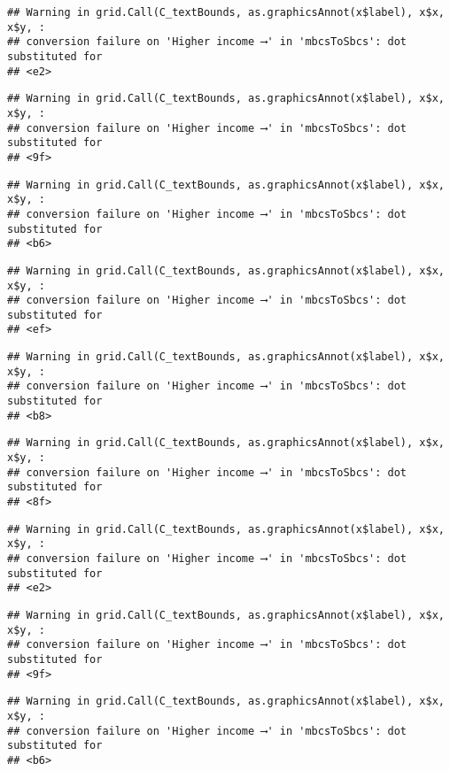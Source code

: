 \documentclass[
]{article}
\begin{document}
\begin{verbatim}
## Warning in grid.Call(C_textBounds, as.graphicsAnnot(x$label), x$x, x$y, :
## conversion failure on 'Higher income ⟶️' in 'mbcsToSbcs': dot substituted for
## <e2>
\end{verbatim}

\begin{verbatim}
## Warning in grid.Call(C_textBounds, as.graphicsAnnot(x$label), x$x, x$y, :
## conversion failure on 'Higher income ⟶️' in 'mbcsToSbcs': dot substituted for
## <9f>
\end{verbatim}

\begin{verbatim}
## Warning in grid.Call(C_textBounds, as.graphicsAnnot(x$label), x$x, x$y, :
## conversion failure on 'Higher income ⟶️' in 'mbcsToSbcs': dot substituted for
## <b6>
\end{verbatim}

\begin{verbatim}
## Warning in grid.Call(C_textBounds, as.graphicsAnnot(x$label), x$x, x$y, :
## conversion failure on 'Higher income ⟶️' in 'mbcsToSbcs': dot substituted for
## <ef>
\end{verbatim}

\begin{verbatim}
## Warning in grid.Call(C_textBounds, as.graphicsAnnot(x$label), x$x, x$y, :
## conversion failure on 'Higher income ⟶️' in 'mbcsToSbcs': dot substituted for
## <b8>
\end{verbatim}

\begin{verbatim}
## Warning in grid.Call(C_textBounds, as.graphicsAnnot(x$label), x$x, x$y, :
## conversion failure on 'Higher income ⟶️' in 'mbcsToSbcs': dot substituted for
## <8f>
\end{verbatim}

\begin{verbatim}
## Warning in grid.Call(C_textBounds, as.graphicsAnnot(x$label), x$x, x$y, :
## conversion failure on 'Higher income ⟶️' in 'mbcsToSbcs': dot substituted for
## <e2>
\end{verbatim}

\begin{verbatim}
## Warning in grid.Call(C_textBounds, as.graphicsAnnot(x$label), x$x, x$y, :
## conversion failure on 'Higher income ⟶️' in 'mbcsToSbcs': dot substituted for
## <9f>
\end{verbatim}

\begin{verbatim}
## Warning in grid.Call(C_textBounds, as.graphicsAnnot(x$label), x$x, x$y, :
## conversion failure on 'Higher income ⟶️' in 'mbcsToSbcs': dot substituted for
## <b6>
\end{verbatim}
\end{document}
